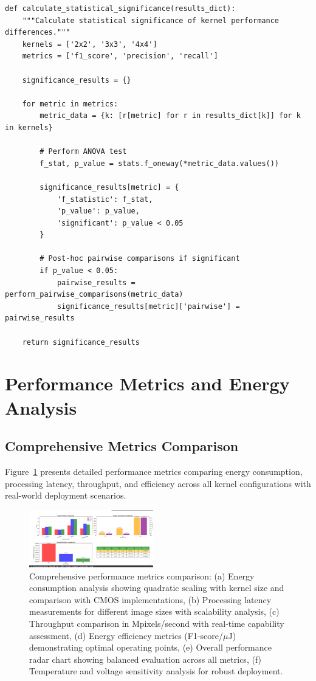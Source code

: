 \documentclass[conference]{IEEEtran}
\begin{document}
\begin{lstlisting}[caption={Performance optimization implementation}]
def calculate_statistical_significance(results_dict):
    """Calculate statistical significance of kernel performance differences."""
    kernels = ['2x2', '3x3', '4x4']
    metrics = ['f1_score', 'precision', 'recall']
    
    significance_results = {}
    
    for metric in metrics:
        metric_data = {k: [r[metric] for r in results_dict[k]] for k in kernels}
        
        # Perform ANOVA test
        f_stat, p_value = stats.f_oneway(*metric_data.values())
        
        significance_results[metric] = {
            'f_statistic': f_stat,
            'p_value': p_value,
            'significant': p_value < 0.05
        }
        
        # Post-hoc pairwise comparisons if significant
        if p_value < 0.05:
            pairwise_results = perform_pairwise_comparisons(metric_data)
            significance_results[metric]['pairwise'] = pairwise_results
    
    return significance_results
\end{lstlisting}

\section{Performance Metrics and Energy Analysis}

\subsection{Comprehensive Metrics Comparison}

Figure~\ref{fig:metrics_comparison} presents detailed performance metrics comparing energy consumption, processing latency, throughput, and efficiency across all kernel configurations with real-world deployment scenarios.

\begin{figure}[htbp]
\centerline{\includegraphics[width=0.48\textwidth]{Screenshot 2025-07-12 123917.png}}
\caption{Comprehensive performance metrics comparison: (a) Energy consumption analysis showing quadratic scaling with kernel size and comparison with CMOS implementations, (b) Processing latency measurements for different image sizes with scalability analysis, (c) Throughput comparison in Mpixels/second with real-time capability assessment, (d) Energy efficiency metrics (F1-score/$\mu$J) demonstrating optimal operating points, (e) Overall performance radar chart showing balanced evaluation across all metrics, (f) Temperature and voltage sensitivity analysis for robust deployment.}
\label{fig:metrics_comparison}
\end{figure}
\end{document}
